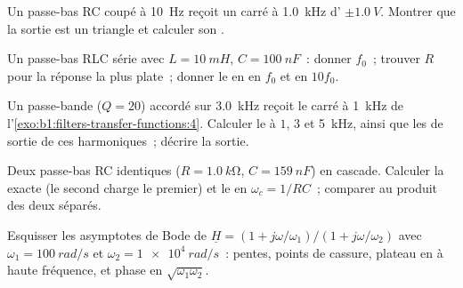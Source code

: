 \begin{exercise}[$\star\star$]\label{exo:b1:filters-transfer-functions:6}
Un passe-bas RC coupé à \qty{10}{Hz} reçoit un  carré à
\qty{1.0}{kHz} d' $\pm\qty{1.0}{V}$. Montrer que la sortie est
un triangle et calculer son .
\end{exercise}

\begin{exercise}[$\star\star$]\label{exo:b1:filters-transfer-functions:7}
Un passe-bas RLC série avec $L = \qty{10}{mH}$, $C = \qty{100}{nF}$~:
donner $f_0$~; trouver $R$ pour la réponse la plus plate~; donner le
 en  en $f_0$ et en $10f_0$.
\end{exercise}

\begin{exercise}[$\star\star$]\label{exo:b1:filters-transfer-functions:8}
Un passe-bande ($Q = 20$) accordé sur \qty{3.0}{kHz} reçoit le 
carré à \qty{1}{kHz} de l'\cref{exo:b1:filters-transfer-functions:4}.
Calculer le  à $1$, $3$ et \qty{5}{kHz}, ainsi que les  de
sortie de ces harmoniques~; décrire la sortie.
\end{exercise}

\begin{exercise}[$\star\star$]\label{exo:b1:filters-transfer-functions:9}
Deux passe-bas RC identiques ($R = \qty{1.0}{k\ohm}$, $C = \qty{159}{nF}$)
en cascade. Calculer la  exacte (le second charge le
premier) et le  en $\omega_c = 1/RC$~; comparer au produit des deux
 séparés.
\end{exercise}

\begin{exercise}[$\star\star\star$]\label{exo:b1:filters-transfer-functions:10}
Esquisser les asymptotes de Bode de $\underline H = (1 + j\omega/\omega_1)/
(1 + j\omega/\omega_2)$ avec $\omega_1 = \qty{100}{rad/s}$ et $\omega_2 =
\qty{1e4}{rad/s}$~: pentes, points de cassure, plateau en  à
haute fréquence, et phase en $\sqrt{\omega_1\omega_2}$.
\end{exercise}

